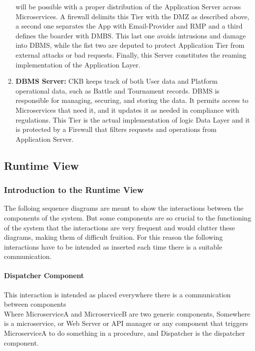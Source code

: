 \begin{enumerate}[label=$\bullet$]
    will be possible with a proper distribution of the Application Server across Microservices. A firewall delimits this Tier with the DMZ as described above, a second one separates the App with Email-Provider and RMP and a third defines the boarder with DMBS.
    This last one avoids intrusions and damage into DBMS, while the fist two are deputed to protect Application Tier from external attacks or bad requests. Finally, this Server constitutes the reaming implementation of the Application Layer.
    \item \textbf{DBMS Server:} CKB keeps track of both User data and Platform operational data, such as Battle and Tournament records. DBMS is responsible for managing, securing, and storing the data. It permits access to 
    Microservices that need it, and it updates it as needed in compliance with regulations. This Tier is the actual implementation of logic Data Layer and it is protected by a Firewall that filters requests and operations from Application Server. 
\end{enumerate}
\clearpage
\subsection{Runtime View}
\subsubsection{Introduction to the Runtime View}
The folloing sequence diagrams are meant to show the interactions between the components of the system.
But some components are so crucial to the functioning of the system that the interactions are very frequent and would clutter these diagrams, making them of difficult fruition.
For this reason the following interactions have to be intended as inserted each time there is a suitable communication.
\paragraph*{Dispatcher Component} \label{parr:dispatcher}
This interaction is intended as placed everywhere there is a communication between components\\
Where MicroserviceA and MicroserviceB are two generic components, Somewhere is a microservice, or Web Server or API manager or any component that triggers MicroserviceA to do something in a procedure, and Dispatcher is the dispatcher component.
